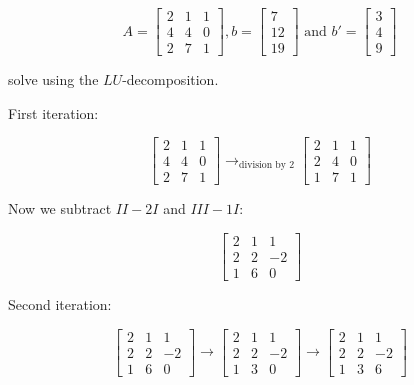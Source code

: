 \[
    A = 
    \begin{bmatrix}
        2 & 1 & 1 \\ 
        4 & 4 & 0 \\ 
        2 & 7 & 1
    \end{bmatrix}, 
    b = 
    \begin{bmatrix}
        7 \\ 
        12 \\ 
        19
    \end{bmatrix}
    \text{ and }
    b' = 
    \begin{bmatrix}
        3 \\ 
        4 \\ 
        9
    \end{bmatrix}
\]

solve using the \(LU\)-decomposition.

First iteration:

\[
    \begin{bmatrix}
        2 & 1 & 1 \\ 
        4 & 4 & 0 \\ 
        2 & 7 & 1
    \end{bmatrix}  
    \rightarrow_{\text{division by 2}} 
    \begin{bmatrix}
        2 & 1 & 1 \\ 
        2 & 4 & 0 \\ 
        1 & 7 & 1
    \end{bmatrix}
\]

Now we subtract \(II - 2I\) and \(III - 1I\):

\[
    \begin{bmatrix}
        2 & 1 & 1 \\ 
        2 & 2 & -2 \\ 
        1 & 6 & 0
    \end{bmatrix}
\]

Second iteration:

\[
    \begin{bmatrix}
        2 & 1 & 1 \\ 
        2 & 2 & -2 \\ 
        1 & 6 & 0
    \end{bmatrix}
    \rightarrow 
    \begin{bmatrix}
        2 & 1 & 1 \\ 
        2 & 2 & -2 \\ 
        1 & 3 & 0
    \end{bmatrix}
    \rightarrow
    \begin{bmatrix}
        2 & 1 & 1 \\ 
        2 & 2 & -2 \\ 
        1 & 3 & 6
    \end{bmatrix}
\]

